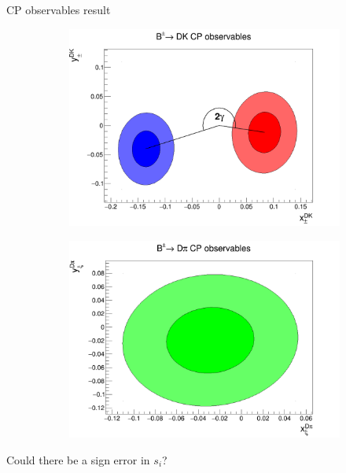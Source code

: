 \documentclass{beamer}
\begin{document}
\begin{frame}{CP observables result}
  \begin{figure}
    \centering
    \begin{subfigure}{0.50\textwidth}
      \includegraphics[width = 1.0\textwidth]{Plots/B2DK_CP_Observables_Contours.png}
    \end{subfigure}%
    \begin{subfigure}{0.50\textwidth}
      \includegraphics[width = 1.0\textwidth]{Plots/B2Dpi_CP_Observables_Contours.png}
    \end{subfigure}
  \end{figure}
  \begin{center}
    \huge Could there be a sign error in $s_i$?
  \end{center}
\end{frame}
\end{document}
